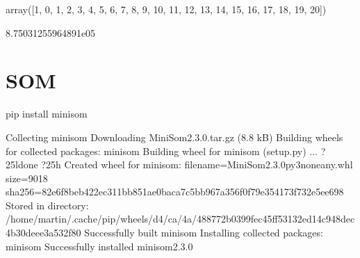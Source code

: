 \documentclass[letterpaper,10pt,english]{jupyterBook}
\begin{document}
\begin{sphinxVerbatim}[commandchars=\\\{\}]
   
     
  
\end{sphinxVerbatim}

\begin{sphinxVerbatim}[commandchars=\\\{\}]
\end{sphinxVerbatim}

\begin{sphinxVerbatim}[commandchars=\\\{\}]
array([\PYGZhy{}1,  0,  1,  2,  3,  4,  5,  6,  7,  8,  9, 10, 11, 12, 13, 14, 15,
       16, 17, 18, 19, 20])
\end{sphinxVerbatim}

\begin{sphinxVerbatim}[commandchars=\\\{\}]
 
\end{sphinxVerbatim}

\begin{sphinxVerbatim}[commandchars=\\\{\}]
8.75031255964891e\PYGZhy{}05
\end{sphinxVerbatim}


\chapter{SOM}
\label{\detokenize{Text_Clustering:id1}}
\begin{sphinxVerbatim}[commandchars=\\\{\}]
pip install minisom
\end{sphinxVerbatim}

\begin{sphinxVerbatim}[commandchars=\\\{\}]
Collecting minisom
  Downloading MiniSom\PYGZhy{}2.3.0.tar.gz (8.8 kB)
Building wheels for collected packages: minisom
  Building wheel for minisom (setup.py) ... ?25ldone
?25h  Created wheel for minisom: filename=MiniSom\PYGZhy{}2.3.0\PYGZhy{}py3\PYGZhy{}none\PYGZhy{}any.whl size=9018 sha256=82e6f8beb422ec311bb851ae0baca7c5bb967a356f0f79e354173f732e5ee698
  Stored in directory: /home/martin/.cache/pip/wheels/d4/ca/4a/488772b0399fec45ff53132ed14c948dec4b30deee3a532f80
Successfully built minisom
Installing collected packages: minisom
Successfully installed minisom\PYGZhy{}2.3.0
\end{sphinxVerbatim}
\end{document}

